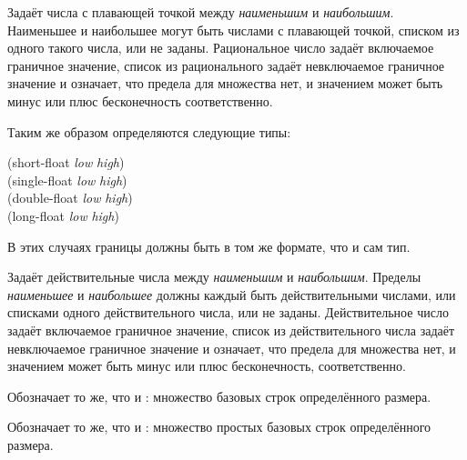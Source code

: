 \begin{flushdesc}
\item[\cd{(float \emph{наименьшее} \emph{наибольшее})}]
Задаёт числа с плавающей точкой  между \emph{наименьшим} и
\emph{наибольшим}. Наименьшее и наибольшее могут быть числами с плавающей точкой, списком
из одного такого числа, или не заданы.
Рациональное число задаёт включаемое граничное значение, список из
рационального задаёт невключаемое граничное значение и \cdf{*} означает, что
предела для множества нет, и значением может быть минус или плюс бесконечность
соответственно.

Таким же образом определяются следующие типы:
\begin{lisp}
(short-float \emph{low} \emph{high}) \\
(single-float \emph{low} \emph{high}) \\
(double-float \emph{low} \emph{high}) \\
(long-float \emph{low} \emph{high})
\end{lisp}
В этих случаях границы должны быть в том же формате, что и сам тип.
\end{flushdesc}

\begin{newer}
\begin{flushdesc}
\item[\cd{(real \emph{наименьшее} \emph{наибольшее})}]
Задаёт действительные числа между \emph{наименьшим} и \emph{наибольшим}. Пределы
\emph{наименьшее} и \emph{наибольшее} должны каждый быть действительными числами, или
списками одного действительного числа, или не заданы.
Действительное число задаёт включаемое граничное значение, список из
действительного числа задаёт невключаемое граничное значение и \cdf{*} означает,
что предела для множества нет, и значением может быть минус или плюс
бесконечность, соответственно.
\end{flushdesc}
\end{newer}

\begin{newer}
\begin{flushdesc}
\item[\cd{(base-string \emph{размер})}]
Обозначает то же, что и : множество
базовых строк определённого размера.

\item[\cd{(simple-base-string \emph{размер})}]
Обозначает то же, что и : множество
простых базовых строк определённого размера.
\end{flushdesc}
\end{newer}

